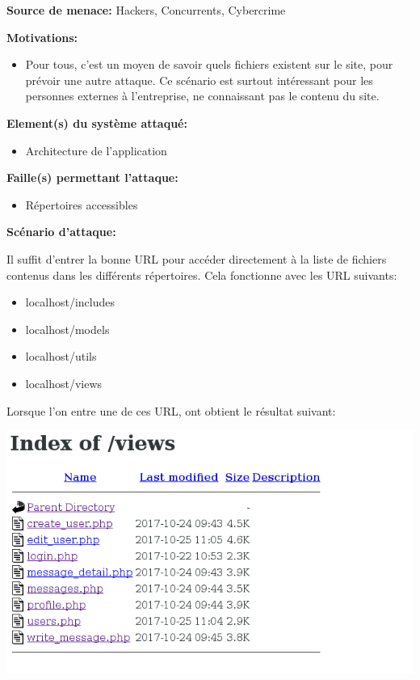 \documentclass{article}
\begin{document}
\textbf{Source de menace:} Hackers, Concurrents, Cybercrime

\textbf{Motivations:}

\begin{itemize}
\tightlist
\item
  Pour tous, c'est un moyen de savoir quels fichiers existent sur le
  site, pour prévoir une autre attaque. Ce scénario est surtout
  intéressant pour les personnes externes à l'entreprise, ne connaissant
  pas le contenu du site.
\end{itemize}

\textbf{Element(s) du système attaqué:}

\begin{itemize}
\tightlist
\item
  Architecture de l'application
\end{itemize}

\textbf{Faille(s) permettant l'attaque:}

\begin{itemize}
\tightlist
\item
  Répertoires accessibles
\end{itemize}

\textbf{Scénario d'attaque:}

Il suffit d'entrer la bonne URL pour accéder directement à la liste de
fichiers contenus dans les différents répertoires. Cela fonctionne avec
les URL suivants:

\begin{itemize}
\tightlist
\item
  localhost/includes
\item
  localhost/models
\item
  localhost/utils
\item
  localhost/views
\end{itemize}

Lorsque l'on entre une de ces URL, ont obtient le résultat suivant:

\includegraphics{images/repertoire.png}
\end{document}

